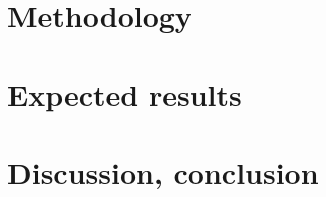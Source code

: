 \documentclass[english]{hogent-article}
\begin{document}
\lipsum[4-9]

\section{Methodology}%
\label{sec:methodology}


\lipsum[10-12]

\section{Expected results}%
\label{sec:expected-results}


\lipsum[14-18]

\section{Discussion, conclusion}%
\label{sec:discussion-conclusion}

\lipsum[19-21]


\printbibliography[heading=bibintoc]
\end{document}
